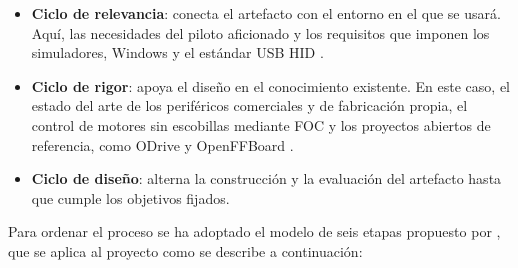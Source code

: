 \begin{itemize}
	\item \textbf{Ciclo de relevancia}: conecta el artefacto con el entorno en el que se usará. Aquí, las necesidades del piloto aficionado y los requisitos que imponen los simuladores, Windows y el estándar USB HID \parencite{usb_hid_pid}.
	\item \textbf{Ciclo de rigor}: apoya el diseño en el conocimiento existente. En este caso, el estado del arte de los periféricos comerciales y de fabricación propia, el control de motores sin escobillas mediante FOC y los proyectos abiertos de referencia, como ODrive \parencite{odrive_github} y OpenFFBoard \parencite{openffboard_github}.
	\item \textbf{Ciclo de diseño}: alterna la construcción y la evaluación del artefacto hasta que cumple los objetivos fijados.
\end{itemize}

Para ordenar el proceso se ha adoptado el modelo de seis etapas propuesto por \textcite{peffers_2007_dsrm}, que se aplica al proyecto como se describe a continuación:


